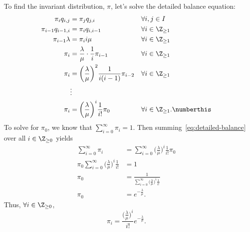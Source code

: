 \documentclass[
  coursecode={MTHE 455},
  assignmentname={Assignment \assignmentnumber},
  studentnumber=20053722,
  name={Bryan Hoang},
  draft,
]{
  ltxanswer%
}
\begin{document}
\begin{questions}
\begin{parts}
      \part{}
      \begin{solution}
        To find the invariant distribution, \(\pi\), let's solve the detailed balance equation:
        \begin{align*}
          \pi_{i}q_{i,j}     &= \pi_{j}q_{j,i}                                                   & &\forall i,j \in I                                               \\
          \pi_{i-1}q_{i-1,i} &= \pi_{i}q_{i,i-1}                                                 & &\forall i \in \Z_{\ge 1}                                        \\
          \pi_{i-1}\lambda   &= \pi_{i}i\mu                                                      & &\forall i \in \Z_{\ge 1}                                        \\
          \pi_{i}            &= \frac{\lambda}{\mu} \cdot \frac{1}{i} \pi_{i-1}                  & &\forall i \in \Z_{\ge 1}                                        \\
          \pi_{i}            &= \biggl(\frac{\lambda}{\mu}\biggr)^{2} \frac{1}{i(i-1)} \pi_{i-2} & &\forall i \in \Z_{\ge 1}                                        \\
                             &\vdots                                                                                                                                \\
          \pi_{i}            &= \biggl(\frac{\lambda}{\mu}\biggr)^{i} \frac{1}{i!} \pi_{0}       & &\forall i \in \Z_{\ge 1}.\numberthis\label{eq:detailed-balance}
        \end{align*}
        To solve for \(\pi_{0}\), we know that \(\sum_{i=0}^{\infty} \pi_{i}=1\). Then summing~\eqref{eq:detailed-balance} over all \(i \in \Z_{\ge0}\) yields
        \begin{align*}
          \sum_{i=0}^{\infty} \pi_{i}                                                    &= \sum_{i=0}^{\infty} \biggl(\frac{\lambda}{\mu}\biggr)^{i} \frac{1}{i!} \pi_{0} \\
          \pi_{0} \sum_{i=0}^{\infty} \biggl(\frac{\lambda}{\mu}\biggr)^{i} \frac{1}{i!} &= 1                                                                              \\
          \pi_{0}                                                                        &= \frac{1}{\sum_{i=0}^{\infty} \bigl(\frac{\lambda}{\mu}\bigr)^{i} \frac{1}{i!}} \\
          \pi_{0}                                                                        &= e^{-\frac{\lambda}{\mu}}.
        \end{align*}
        Thus, \(\forall i \in \Z_{\ge0}\),
        \begin{equation*}
          \boxed{\pi_{i} = \frac{\bigl(\frac{\lambda}{\mu}\bigr)^{i}}{i!}e^{-\frac{\lambda}{\mu}}}.
        \end{equation*}
      \end{solution}
    \end{parts}
  \end{questions}
\end{document}
